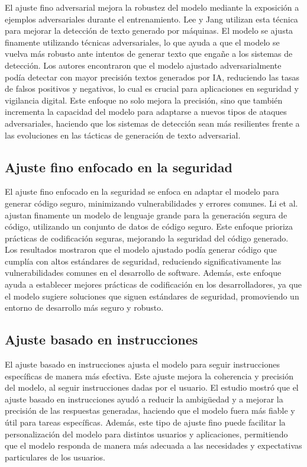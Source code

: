 El ajuste fino adversarial mejora la robustez del modelo mediante la exposición a ejemplos adversariales durante el entrenamiento. Lee y Jang \cite{Lee2024} utilizan esta técnica para mejorar la detección de texto generado por máquinas. El modelo se ajusta finamente utilizando técnicas adversariales, lo que ayuda a que el modelo se vuelva más robusto ante intentos de generar texto que engañe a los sistemas de detección. Los autores encontraron que el modelo ajustado adversarialmente podía detectar con mayor precisión textos generados por IA, reduciendo las tasas de falsos positivos y negativos, lo cual es crucial para aplicaciones en seguridad y vigilancia digital. Este enfoque no solo mejora la precisión, sino que también incrementa la capacidad del modelo para adaptarse a nuevos tipos de ataques adversariales, haciendo que los sistemas de detección sean más resilientes frente a las evoluciones en las tácticas de generación de texto adversarial.

\subsection{Ajuste fino enfocado en la seguridad}

El ajuste fino enfocado en la seguridad se enfoca en adaptar el modelo para generar código seguro, minimizando vulnerabilidades y errores comunes. Li et al. \cite{JLi2024}  ajustan finamente un modelo de lenguaje grande para la generación segura de código, utilizando un conjunto de datos de código seguro. Este enfoque prioriza prácticas de codificación seguras, mejorando la seguridad del código generado. Los resultados mostraron que el modelo ajustado podía generar código que cumplía con altos estándares de seguridad, reduciendo significativamente las vulnerabilidades comunes en el desarrollo de software. Además, este enfoque ayuda a establecer mejores prácticas de codificación en los desarrolladores, ya que el modelo sugiere soluciones que siguen estándares de seguridad, promoviendo un entorno de desarrollo más seguro y robusto.

\subsection{Ajuste basado en instrucciones}

El ajuste basado en instrucciones \cite{Liesenfeld2023} ajusta el modelo para seguir instrucciones específicas de manera más efectiva. Este ajuste mejora la coherencia y precisión del modelo, al seguir instrucciones dadas por el usuario. El estudio mostró que el ajuste basado en instrucciones ayudó a reducir la ambigüedad y a mejorar la precisión de las respuestas generadas, haciendo que el modelo fuera más fiable y útil para tareas específicas. Además, este tipo de ajuste fino puede facilitar la personalización del modelo para distintos usuarios y aplicaciones, permitiendo que el modelo responda de manera más adecuada a las necesidades y expectativas particulares de los usuarios.

